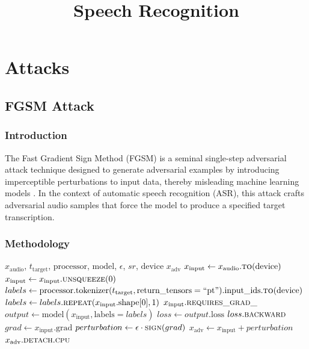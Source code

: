 \documentclass[a4paper,12pt]{article}
\date{}
\title{Speech Recognition}
\begin{document}
\maketitle

\section{Attacks}
\subsection{FGSM Attack}
\subsubsection{Introduction}
The Fast Gradient Sign Method (FGSM) is a seminal single-step adversarial attack technique designed to generate adversarial examples by introducing imperceptible perturbations to input data, thereby misleading machine learning models \cite{goodfellow2015explaining}. In the context of automatic speech recognition (ASR), this attack crafts adversarial audio samples that force the model to produce a specified target transcription\cite{zelasko2021adversarial}.

\subsubsection{Methodology}
\begin{algorithm}
\caption{Fast Gradient Sign Method (FGSM) Attack}
\begin{algorithmic}[1]
\Require $x_{\text{audio}}$, $t_{\text{target}}$, $\text{processor}$, $\text{model}$, $\epsilon$, $sr$, $\text{device}$ 
\Ensure $x_{\text{adv}}$ 
\State $x_{\text{input}} \gets x_{\text{audio}}.\Call{to}{\text{device}}$ 
    \State $x_{\text{input}} \gets x_{\text{input}}.\Call{unsqueeze}{0}$ 
\EndIf
\State $labels \gets \text{processor}.\text{tokenizer}(t_{\text{target}}, \text{return\_tensors}=\text{``pt''}).\text{input\_ids}.\Call{to}{\text{device}}$ 
\State $labels \gets labels.\Call{repeat}{x_{\text{input}}.\text{shape}[0], 1}$ 
\State $x_{\text{input}}.\Call{requires\_grad\_}{}$ 
\State $output \gets \text{model}(x_{\text{input}}, \text{labels}=labels)$ 
\State $loss \gets output.\text{loss}$ 
\State $loss.\Call{backward}{}$ 
\State $grad \gets x_{\text{input}}.\text{grad}$ 
\State $perturbation \gets \epsilon \cdot \Call{sign}{grad}$ 
\State $x_{\text{adv}} \gets x_{\text{input}} + perturbation$ 
\State \Return $x_{\text{adv}}.\Call{detach}{}.\Call{cpu}{}$ 
\end{algorithmic}
\end{algorithm}
\end{document}
